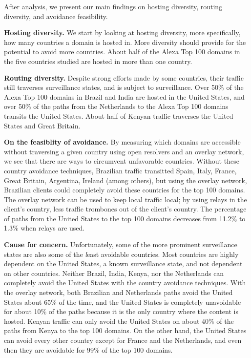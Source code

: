 After analysis, we present our main findings on hosting diversity, routing diversity, 
and avoidance feasibility.  

{\bf Hosting diversity.} We start by looking at hosting diversity, more specifically, how many
countries a domain is hosted in.  More diversity should provide for the
potential to avoid more countries.  About half of the
Alexa Top 100 domains in the five countries studied are hosted in more
than one country. 

{\bf Routing diversity.} Despite strong efforts made by some countries,
their traffic still traverses surveillance states, and is
subject to surveillance.  Over 50\% of the Alexa Top 100 domains in
Brazil and India are hosted in the United States, and over 50\% of the
paths from the Netherlands to the Alexa Top 100 domains transits the
United States.  About half of Kenyan traffic traverses the United States
and Great Britain.   

{\bf On the feasiblity of avoidance.} By measuring which domains are accessible without traversing a given
country using open resolvers and an overlay network, we see that
there are ways to circumvent unfavorable countries.  Without these
country avoidance techniques, Brazilian traffic transitted Spain, Italy,
France, Great Britain, Argentina, Ireland (among others), but using the
overlay network, Brazilian clients could completely avoid these
countries for the top 100 domains.  The overlay network can be used to
keep local traffic local; by using relays in the client's country, less
traffic trombones out of the client's country.  The percentage of paths
from the United States to the top 100 domains decreases from 11.2\% to 1.3\% when
relays are used.   

{\bf Cause for concern.} Unfortunately, some of the more prominent surveillance states are also
some of the {\textit least avoidable} countries.  Most countries are
highly dependent on the United States, a known surveillance state, and
not dependent on other countries.  Neither Brazil, India, Kenya, nor the
Netherlands can completely avoid the United States with the country
avoidance techniques.  With the overlay network, both Brazilian and
Netherlands paths avoid the United States about 65\% of the time, and
the United States is completely unavoidable for about 10\% of the paths
because it is the only country where the content is hosted.  Kenyan traffic can
only avoid the United States on about 40\% of the paths from Kenya to
the top 100 domains.  On the other hand, the United States can avoid
every other country except for France and the Netherlands, and even then
they are avoidable for 99\% of the top 100 domains. 

